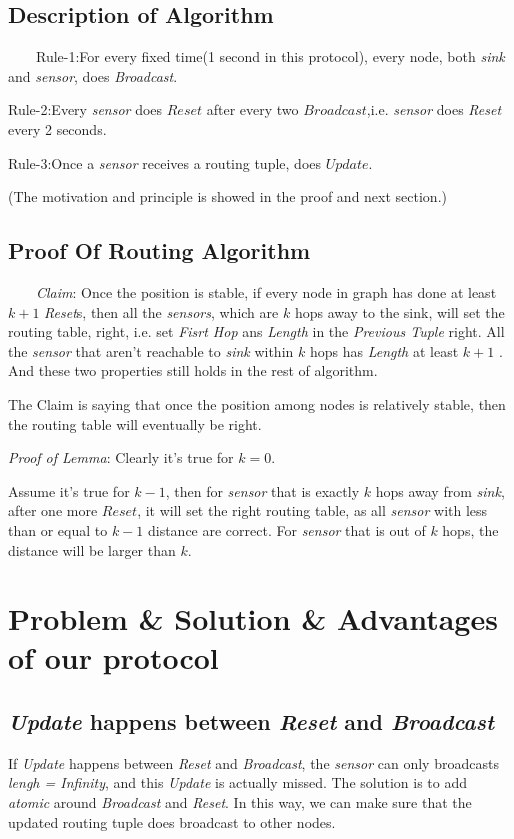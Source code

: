 \documentclass[a4paper]{article}
\begin{document}
\subsection{Description of Algorithm}
\ \ \ \ Rule-1:For every fixed time(1 second in this protocol), every node, both \emph{sink} and \emph{sensor}, does \emph{Broadcast}.

Rule-2:Every \emph{sensor} does $Reset$ after every two $Broadcast$,i.e. \emph{sensor} does \emph{Reset} every 2 seconds.

Rule-3:Once a \emph{sensor} receives a routing tuple, does $Update$.

(The motivation and principle is showed in the proof and next section.)

\subsection{Proof Of Routing Algorithm}
\ \ \ \ \emph{Claim}: Once the position is stable, if every node in graph has done at least $k+1$ \emph{Reset}s, then all the \emph{sensors}, which are $k$ hops away to the sink, will set the routing table, right, i.e. set \emph{Fisrt Hop} ans \emph{Length} in the \emph{Previous Tuple} right. All the \emph{sensor} that aren't reachable to \emph{sink} within $k$ hops has \emph{Length} at least $k+1$ . And these two properties still holds in the rest of algorithm.

The Claim is saying that once the position among nodes is relatively stable, then the routing table will eventually be right.

\emph{Proof of Lemma}: Clearly it's true for $k=0$.

Assume it's true for $k-1$, then for \emph{sensor} that is exactly $k$ hops away from \emph{sink}, after one more $Reset$, it will set the right routing table, as all \emph{sensor} with less than or equal to $k-1$ distance are correct. For \emph{sensor} that is out of $k$ hops, the distance will be larger than $k$.



\section{Problem \& Solution \& Advantages of our protocol}
\subsection{\emph{Update} happens between \emph{Reset} and \emph{Broadcast} }
If \emph{Update} happens between \emph{Reset} and \emph{Broadcast}, the \emph{sensor} can only broadcasts \emph{lengh = Infinity}, and this \emph{Update} is actually missed. The solution is to add \emph{atomic} around \emph{Broadcast} and \emph{Reset}. In this way, we can make sure that the updated routing tuple does broadcast to other nodes.
\end{document}
